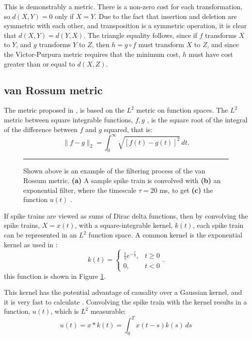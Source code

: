 This is demonstrably a metric. There is a non-zero cost for each transformation, so $d(X,Y)=0$ only if $X=Y$. Due to the fact that insertion and deletion are symmetric with each other, and transposition is a symmetric operation, it is clear that $d(X,Y)=d(Y,X)$.  The triangle equality follows, since if $f$ transforms $X$ to $Y$, and $g$ transforms $Y$ to $Z$, then $h=g\circ f$ must transform $X$ to $Z$, and since the Victor-Purpura metric requires that the minimum cost, $h$ must have cost greater than or equal to $d(X,Z)$.

\subsection{van Rossum metric}

The metric proposed in 
\citep{VanRossum2001a}, is based on the $L^2$ metric on function 
spaces.  The $L^2$ metric between square integrable functions, $f,g$ , is the square root of the integral of the difference between $f$ and $g$ squared, that is:
\begin{equation}
\| f - g \|_2 = \int_0^{\infty} \sqrt{\left[ f(t)-g(t) \right]^2 }\, dt.
\end{equation}

\begin{figure}[htb]

\bigskip
\rule{33em}{0.5pt}
\caption{\label{stk} Shown above is an example of the filtering process of the van Rossum metric.  {\bf (a)} A sample spike train is convolved with {\bf (b)} an exponential filter, where the timescale $\tau=20$ ms, to get {\bf (c)} the function $u(t)$ .}
\end{figure}

If spike trains are viewed as sums of Dirac delta functions, 
then by convolving the spike trains, $X=x(t)$, with 
a square-integrable kernel, $k(t)$, each spike train can be represented in an $L^2$ function space.  A common kernel is the exponential kernel as used in \citep{VanRossum2001a}:
\begin{equation}
k(t) = \left\{ \begin{array}{ll}\frac{1}{\tau}e^{-\frac{t}{\tau}}, & t\geq 0 \\
0, & t<0\end{array} \right. .
\end{equation}
this function is shown in Figure \ref{stk}.

This kernel has the potential advantage of causality over a 
Gaussian kernel, and it is very fast to calculate \citep{HoughtonKreuz2012a}.   Convolving the spike 
train with the kernel results in a function, $u(t)$, which is $L^2$ measurable:
\begin{equation}
u(t) = x*k(t) = \int_0^T x(t-s)k(s)\,ds
\end{equation}



